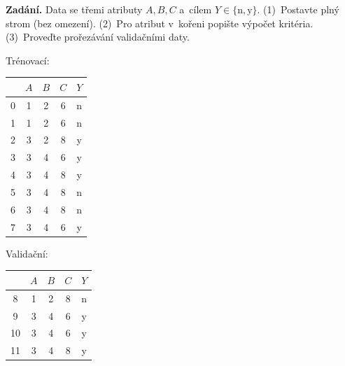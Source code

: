 \begin{priklad}
\par
\textbf{Zadání.} Data se třemi atributy $A,B,C$ a~cílem $Y\in\{\text{n},\text{y}\}$. (1)~Postavte plný strom (bez omezení). (2)~Pro atribut v~kořeni popište výpočet kritéria. (3)~Proveďte prořezávání validačními daty.

\smallskip
\begin{center}\small
\begin{minipage}{0.4\linewidth}\centering Trénovací:\par\medskip
\begin{tabular}{ccccc}\toprule & $A$ & $B$ & $C$ & $Y$ \\\midrule
0 & 1 & 2 & 6 & n \\ 1 & 1 & 2 & 6 & n \\ 2 & 3 & 2 & 8 & y \\ 3 & 3 & 4 & 6 & y \\
4 & 3 & 4 & 8 & y \\ 5 & 3 & 4 & 8 & n \\ 6 & 3 & 4 & 8 & n \\ 7 & 3 & 4 & 6 & y \\\bottomrule
\end{tabular}\end{minipage}\hfill
\begin{minipage}{0.4\linewidth}\centering Validační:\par\medskip
\begin{tabular}{ccccc}\toprule & $A$ & $B$ & $C$ & $Y$ \\\midrule
8  & 1 & 2 & 8 & n \\ 9  & 3 & 4 & 6 & y \\ 10 & 3 & 4 & 6 & y \\ 11 & 3 & 4 & 8 & y \\\bottomrule
\end{tabular}\end{minipage}
\end{center}


\end{priklad}
